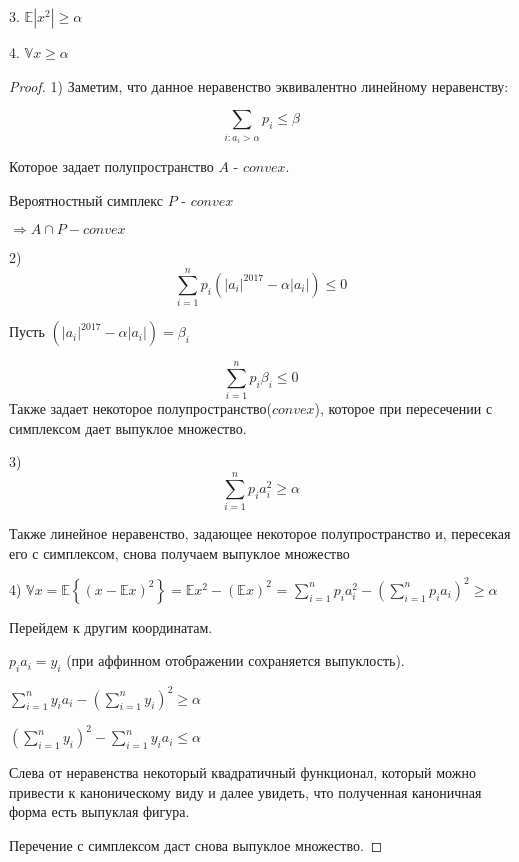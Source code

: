 \documentclass[a4paper,12pt]{article}
\begin{document}
3. $\mathbb{E} |x^{2}| \ge \alpha $

4. $\mathbb{V}x \ge \alpha$

\begin{proof}

1) Заметим, что данное неравенство эквивалентно линейному неравенству:

$$\sum_{i: a_i>\alpha}p_i\leq\beta$$

Которое задает полупространство $A$ - $convex$.

Вероятностный симплекс $P$ - $convex$

$\Rightarrow A \cap P - convex$

2)
$$\sum_{i=1}^{n}p_i\left(\left|a_i\right|^{2017}-\alpha\left|a_i\right|\right)\leq 0$$

Пусть $\left(|a_i|^{2017}-\alpha|a_i|\right) = \beta_i$

$$\sum_{i=1}^{n}p_i\beta_i\leq 0$$
Также задает некоторое полупространство($convex$), которое при пересечении с симплексом дает выпуклое множество.


3) $$\sum_{i=1}^{n}p_ia_i^2\geq\alpha$$

Также линейное неравенство, задающее некоторое полупространство и, пересекая его с симплексом, снова получаем выпуклое множество

4) $\mathbb{V}x = \mathbb{E}\left\{ (x - \mathbb{E}x)^2\right\} = \mathbb{E}x^2 - \left(\mathbb{E}x\right)^2$ = $\sum\limits_{i=1}^n p_i a_i^2 - \left(\sum\limits_{i=1}^n p_i a_i\right)^2 \ge \alpha$
	
Перейдем к другим координатам.

$p_i a_i = y_i$ (при аффинном отображении сохраняется выпуклость).
 	
$\sum\limits_{i=1}^n y_i a_i - \left(\sum\limits_{i=1}^n y_i\right)^2 \ge \alpha$

$\left(\sum\limits_{i=1}^n y_i\right)^2 - \sum\limits_{i=1}^n y_i a_i \le \alpha$

Слева от неравенства некоторый квадратичный функционал, который можно привести к каноническому виду и далее увидеть, что полученная каноничная форма есть выпуклая фигура.

Перечение с симплексом даст снова выпуклое множество.
\end{proof}
\end{document}
